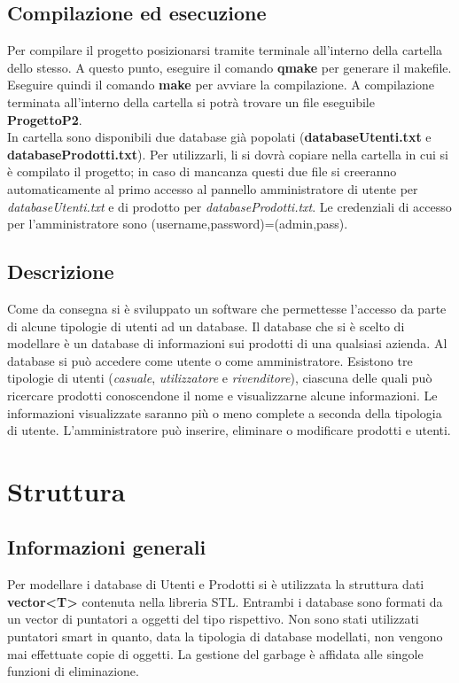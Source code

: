 \documentclass[a4paper,10pt] {article}
\begin{document}
\subsection{Compilazione ed esecuzione}
Per compilare il progetto posizionarsi tramite terminale all'interno della 
cartella dello stesso. A questo punto, eseguire il comando \textbf{qmake} per 
generare
il makefile. Eseguire quindi il comando \textbf{make} per avviare la 
compilazione. A compilazione terminata all'interno della cartella si potrà 
trovare un file 
eseguibile \textbf{ProgettoP2}.\\
In cartella sono disponibili due database già popolati 
(\textbf{databaseUtenti.txt} e \textbf{databaseProdotti.txt}). Per utilizzarli, 
li si dovrà copiare nella cartella in cui si è compilato il progetto; in caso di 
mancanza questi due file si creeranno automaticamente al primo accesso al 
pannello amministratore di utente per \textsl{databaseUtenti.txt} e di prodotto 
per \textsl{databaseProdotti.txt}.
Le credenziali di accesso per l'amministratore sono 
(username,password)=(admin,pass).

\subsection{Descrizione}
Come da consegna si è sviluppato un software che permettesse l'accesso da parte 
di alcune tipologie di utenti ad un database. Il database che si è scelto di 
modellare è un database di informazioni sui prodotti di una qualsiasi azienda. 
Al database si può accedere come utente o come amministratore. Esistono tre 
tipologie di utenti (\textsl{casuale}, \textsl{utilizzatore} e 
\textsl{rivenditore}),
ciascuna delle quali può
ricercare prodotti conoscendone il nome e visualizzarne alcune informazioni. Le 
informazioni visualizzate saranno più o meno complete a seconda della tipologia
di utente. L'amministratore può inserire, eliminare o modificare prodotti e 
utenti.

\newpage

\section{Struttura}

\subsection{Informazioni generali}
Per modellare i database di Utenti e Prodotti si è utilizzata la struttura dati 
\textbf{vector<T>} contenuta nella libreria STL. Entrambi i database sono 
formati
da un vector di puntatori a oggetti del tipo rispettivo. Non sono stati 
utilizzati puntatori smart in quanto, data la tipologia di database modellati, 
non vengono
mai effettuate copie di oggetti. La gestione del garbage è affidata alle singole 
funzioni di eliminazione.
\end{document}
